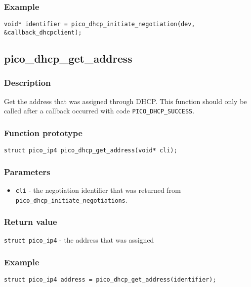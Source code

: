 \subsubsection*{Example}
\begin{verbatim}
void* identifier = pico_dhcp_initiate_negotiation(dev, &callback_dhcpclient);
\end{verbatim}


\subsection{pico\_dhcp\_get\_address}

\subsubsection*{Description}
Get the address that was assigned through DHCP. This function should only be called after
a callback occurred with code \texttt{PICO\_DHCP\_SUCCESS}. 

\subsubsection*{Function prototype}
\texttt{struct pico\_ip4 pico\_dhcp\_get\_address(void* cli);}

\subsubsection*{Parameters}
\begin{itemize}[noitemsep]
\item \texttt{cli} - the negotiation identifier that was returned from \texttt{pico\_dhcp\_initiate\_negotiations}.
\end{itemize}

\subsubsection*{Return value}
\texttt{struct pico\_ip4} - the address that was assigned


\subsubsection*{Example}
\begin{verbatim}
struct pico_ip4 address = pico_dhcp_get_address(identifier);
\end{verbatim}


